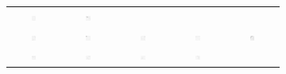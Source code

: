 \begin{figure}
\begin{subfigure}{\textwidth}
\begin{tabular}{c@{\,}c@{\,}c@{\,}c@{\,}c@{}}
			\includegraphics[width=0.1\textwidth]{fig01c04} &
			\includegraphics[width=0.1\textwidth]{fig01c05} \\
			\includegraphics[width=0.1\textwidth]{fig01c06} &
			\includegraphics[width=0.1\textwidth]{fig01c07} &
			\includegraphics[width=0.1\textwidth]{fig01c08} &
			\includegraphics[width=0.1\textwidth]{fig01c09} &
			\includegraphics[width=0.1\textwidth]{fig01c10} \\
			\includegraphics[width=0.1\textwidth]{fig01c11} &
			\includegraphics[width=0.1\textwidth]{fig01c12} &
			\includegraphics[width=0.1\textwidth]{fig01c13} &
			\includegraphics[width=0.1\textwidth]{fig01c14} &

\end{tabular}
\end{subfigure}
\end{figure}
